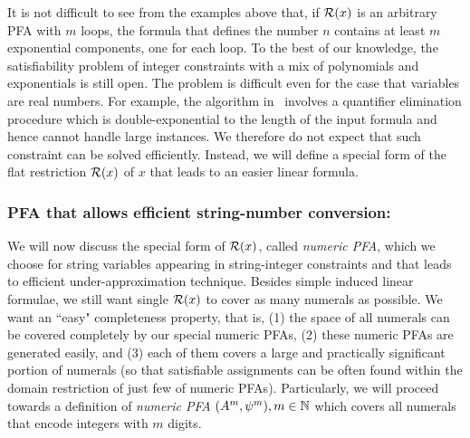 \documentclass[sigplan,screen]{acmart}
\begin{document}
It is not difficult to see from the examples above that, if $\mathcal{R}(x)$ is an arbitrary PFA with $m$ loops, the formula that defines the number $n$ contains at least $m$ exponential components, one for each loop.
To the best of our knowledge, the satisfiability problem of integer constraints with a mix of polynomials and exponentials is still open. The problem is difficult even for the case that variables are real numbers. For example, the algorithm in~\cite{kincaid2019closed} involves a quantifier elimination procedure which is double-exponential to the length of the input formula and hence cannot handle large instances. We therefore do not expect that such constraint can be solved efficiently. Instead, we will define a special form of the flat restriction $\mathcal{R}(x)$ of $x$ that leads to an easier linear formula.

\subsubsection*{PFA that allows efficient string-number conversion: } 
We will now discuss the special form of $\mathcal{R}(x)$, called \emph{numeric PFA}, which we choose for string variables appearing in string-integer constraints and that leads to efficient under-approximation technique.
%
Besides simple induced linear formulae, we still want single $\mathcal{R}(x)$ to cover as many numerals as possible.
We want an ``easy" completeness property, that is,  (1) the space of all numerals can be covered completely by our special numeric PFAs, (2) these numeric PFAs are generated easily, and (3) each of them covers a large and practically significant portion of numerals (so that satisfiable assignments can be often found within the domain restriction of just few of numeric PFAs).
%
Particularly, we will proceed towards a definition of \emph{numeric PFA} $(A^m,\psi^m),m\in\mathbb{N}$ which covers all numerals that encode integers with $m$ digits.
\end{document}
